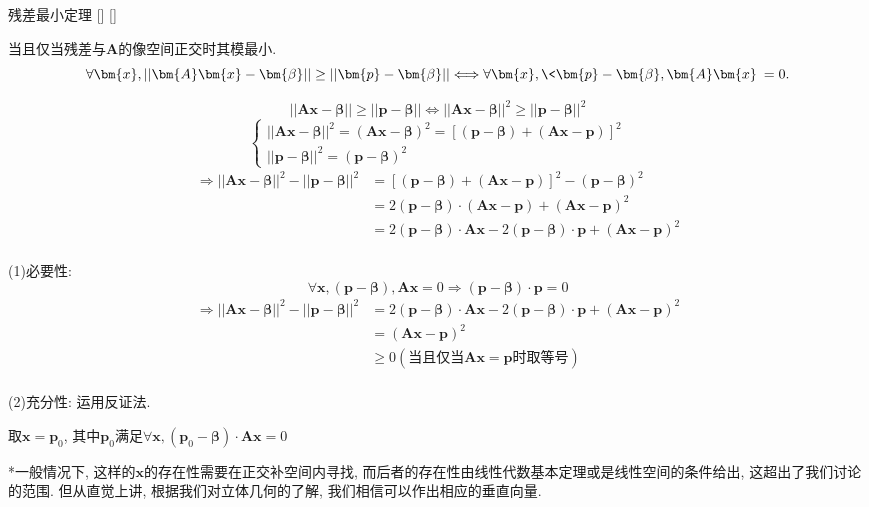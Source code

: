 \documentclass[UTF8]{ctexart}
\begin{document}
		\begin{thm}
			[]
			{残差最小定理}
			[]
			[]

			当且仅当残差与$\bm{A}$的像空间正交时其模最小. 
			\[\forall\bm{x}, ||\bm{A}\bm{x}-\bm{\beta}||\geq||\bm{p}-\bm{\beta}||\Longleftrightarrow \forall\bm{x}, \<\bm{p}-\bm{\beta},\bm{A}\bm{x}\>=0. \]
		\end{thm}
		
		\begin{prf}
			\[||\bm{A}\bm{x}-\bm{\beta}||\geq||\bm{p}-\bm{\beta}||\Longleftrightarrow||\bm{A}\bm{x}-\bm{\beta}||^2\geq||\bm{p}-\bm{\beta}||^2\]
			\[\begin{cases}
			||\bm{A}\bm{x}-\bm{\beta}||^2=(\bm{A}\bm{x}-\bm{\beta})^2=[(\bm{p}-\bm{\beta})+(\bm{A}\bm{x}-\bm{p})]^2\\
			||\bm{p}-\bm{\beta}||^2=(\bm{p}-\bm{\beta})^2
			\end{cases}\]
			\[\begin{aligned}
			\Longrightarrow||\bm{A}\bm{x}-\bm{\beta}||^2-||\bm{p}-\bm{\beta}||^2 & = [(\bm{p}-\bm{\beta})+(\bm{A}\bm{x}-\bm{p})]^2-(\bm{p}-\bm{\beta})^2\\
			& = 2(\bm{p}-\bm{\beta})\cdot(\bm{A}\bm{x}-\bm{p})+(\bm{A}\bm{x}-\bm{p})^2\\
			& = 2(\bm{p}-\bm{\beta})\cdot\bm{A}\bm{x}-2(\bm{p}-\bm{\beta})\cdot\bm{p}+(\bm{A}\bm{x}-\bm{p})^2\\
			\end{aligned}\]
			
			(1)必要性: 
				\[\forall\bm{x}, (\bm{p}-\bm{\beta}),\bm{A}\bm{x}=0\Longrightarrow(\bm{p}-\bm{\beta})\cdot\bm{p}=0\]
				\[\begin{aligned}
				\Longrightarrow||\bm{A}\bm{x}-\bm{\beta}||^2-||\bm{p}-\bm{\beta}||^2 & = 2(\bm{p}-\bm{\beta})\cdot\bm{A}\bm{x}-2(\bm{p}-\bm{\beta})\cdot\bm{p}+(\bm{A}\bm{x}-\bm{p})^2\\
				& = (\bm{A}\bm{x}-\bm{p})^2\\
				& \geq 0(\text{当且仅当$\bm{A}\bm{x}=\bm{p}$时取等号})\\
				\end{aligned}\]
				
			(2)充分性: 运用反证法. 
				
				取$\bm{x}=\bm{p}_0$, 其中$\bm{p}_0$满足$\forall\bm{x}, (\bm{p}_0-\bm{\beta})\cdot\bm{A}\bm{x}=0$
				
				*一般情况下, 这样的$\bm{x}$的存在性需要在正交补空间内寻找, 而后者的存在性由线性代数基本定理或是线性空间的 条件给出, 这超出了我们讨论的范围. 但从直觉上讲, 根据我们对立体几何的了解, 我们相信可以作出相应的垂直向量. 
				

\end{prf}
\end{document}

